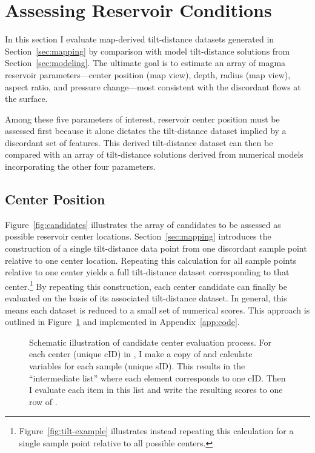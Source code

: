 \section{Assessing Reservoir Conditions}\label{sec:evaluation}

In this section I evaluate map-derived tilt-distance datasets generated in Section~\ref{sec:mapping} by comparison with model tilt-distance solutions from Section~\ref{sec:modeling}. The ultimate goal is to estimate an array of magma reservoir parameters---center position (map view), depth, radius (map view), aspect ratio, and pressure change---most consistent with the discordant flows at the surface. 

Among these five parameters of interest, reservoir center position must be assessed first because it alone dictates the tilt-distance dataset implied by a discordant set of features. This derived tilt-distance dataset can then be compared with an array of tilt-distance solutions derived from numerical models incorporating the other four parameters.

\subsection{Center Position}

Figure~\ref{fig:candidates} illustrates the array of candidates to be assessed as possible reservoir center locations. Section~\ref{sec:mapping} introduces the construction of a single tilt-distance data point from one discordant sample point relative to one center location. Repeating this calculation for all sample points relative to one center yields a full tilt-distance dataset corresponding to that center.\footnote{Figure~\ref{fig:tilt-example} illustrates instead repeating this calculation for a single sample point relative to all possible centers.} By repeating this construction, each center candidate can finally be evaluated on the basis of its associated tilt-distance dataset. In general, this means each dataset is reduced to a small set of numerical scores. This approach is outlined in Figure~\ref{fig:eval-model} and implemented in Appendix~\ref{app:code}.

\begin{figure}
    \caption[Center evaluation workflow]{Schematic illustration of candidate center evaluation process. For each center (unique cID) in , I make a copy of  and calculate variables for each sample (unique sID). This results in the ``intermediate list'' where each element corresponds to one cID. Then I evaluate each item in this list and write the resulting scores to one row of .}%
    \label{fig:eval-model}
\end{figure}

